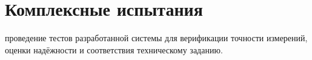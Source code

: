 \section{Комплексные испытания}
\label{sec:field_tests}

проведение тестов разработанной системы для верификации точности измерений, оценки надёжности и соответствия техническому заданию.
